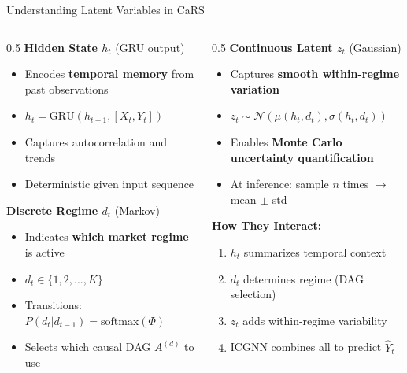 \documentclass[aspectratio=169]{beamer}
\begin{document}
\begin{frame}{Understanding Latent Variables in CaRS}
\begin{columns}
\begin{column}{0.5\textwidth}
\textbf{Hidden State $h_t$} (GRU output)
\begin{itemize}
    \item Encodes \textbf{temporal memory} from past observations
    \item $h_t = \text{GRU}(h_{t-1}, [X_t, Y_t])$
    \item Captures autocorrelation and trends
    \item Deterministic given input sequence
\end{itemize}

\vspace{0.3cm}
\textbf{Discrete Regime $d_t$} (Markov)
\begin{itemize}
    \item Indicates \textbf{which market regime} is active
    \item $d_t \in \{1, 2, ..., K\}$
    \item Transitions: $P(d_t | d_{t-1}) = \text{softmax}(\Phi)$
    \item Selects which causal DAG $A^{(d)}$ to use
\end{itemize}
\end{column}

\begin{column}{0.5\textwidth}
\textbf{Continuous Latent $z_t$} (Gaussian)
\begin{itemize}
    \item Captures \textbf{smooth within-regime variation}
    \item $z_t \sim \mathcal{N}(\mu(h_t, d_t), \sigma(h_t, d_t))$
    \item Enables \textbf{Monte Carlo uncertainty quantification}
    \item At inference: sample $n$ times $\rightarrow$ mean $\pm$ std
\end{itemize}

\vspace{0.3cm}
\textbf{How They Interact:}
\begin{enumerate}
    \item $h_t$ summarizes temporal context
    \item $d_t$ determines regime (DAG selection)
    \item $z_t$ adds within-regime variability
    \item ICGNN combines all to predict $\hat{Y}_t$
\end{enumerate}
\end{column}
\end{columns}
\end{frame}
\end{document}

